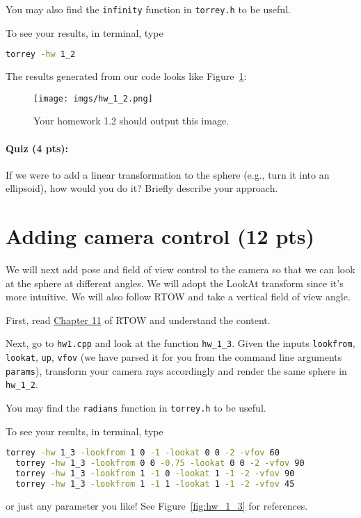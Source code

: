 You may also find the \lstinline{infinity} function in \lstinline{torrey.h} to be useful.

To see your results, in terminal, type
\begin{lstlisting}[language=bash]
  torrey -hw 1_2
\end{lstlisting}

The results generated from our code looks like Figure~\ref{fig:hw_1_2}:
\begin{figure}[ht]
    \centering
    \texttt{[image: imgs/hw\_1\_2.png]}
    \caption{Your homework 1.2 should output this image.}
    \label{fig:hw_1_2}
\end{figure}

\paragraph{Quiz (4 pts):} If we were to add a linear transformation to the sphere (e.g., turn it into an ellipsoid), how would you do it? Briefly describe your approach.

\section{Adding camera control (12 pts)}
We will next add pose and field of view control to the camera so that we can look at the sphere at different angles. We will adopt the LookAt transform since it's more intuitive. We will also follow RTOW and take a vertical field of view angle.

First, read \href{https://raytracing.github.io/books/RayTracingInOneWeekend.html#positionablecamera}{Chapter 11} of RTOW and understand the content.

Next, go to \lstinline{hw1.cpp} and look at the function \lstinline{hw_1_3}. Given the inputs \lstinline{lookfrom}, \lstinline{lookat}, \lstinline{up}, \lstinline{vfov} (we have parsed it for you from the command line arguments \lstinline{params}), transform your camera rays accordingly and render the same sphere in \lstinline{hw_1_2}.

You may find the \lstinline{radians} function in \lstinline{torrey.h} to be useful.

To see your results, in terminal, type
\begin{lstlisting}[language=bash]
  torrey -hw 1_3 -lookfrom 1 0 -1 -lookat 0 0 -2 -vfov 60
  torrey -hw 1_3 -lookfrom 0 0 -0.75 -lookat 0 0 -2 -vfov 90
  torrey -hw 1_3 -lookfrom 1 -1 0 -lookat 1 -1 -2 -vfov 90
  torrey -hw 1_3 -lookfrom 1 -1 1 -lookat 1 -1 -2 -vfov 45
\end{lstlisting}
or just any parameter you like! See Figure~\ref{fig:hw_1_3} for references.

